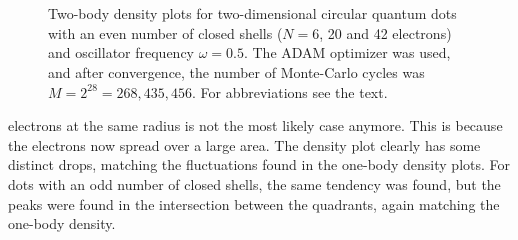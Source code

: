 \begin{figure}[H]
	\centering
	\captionsetup{width=0.9\hsize}
	\captionsetup[subfigure]{labelformat=empty}
	\hspace{0.1cm}
	\\
	
	\hspace{0.1cm}
	\\
	
	\hspace{0.1cm}
	
	\caption{Two-body density plots for two-dimensional circular quantum dots with an even number of closed shells ($N=6$, 20 and 42 electrons) and oscillator frequency $\omega=0.5$. The ADAM optimizer was used, and after convergence, the number of Monte-Carlo cycles was $M=2^{28}=268,435,456$. For abbreviations see the text.}%
	\label{fig:TB_interaction_20P}
\end{figure}
\noindent
electrons at the same radius is not the most likely case anymore. This is because the electrons now spread over a large area. The density plot clearly has some distinct drops, matching the fluctuations found in the one-body density plots. For dots with an odd number of closed shells, the same tendency was found, but the peaks were found in the intersection between the quadrants, again matching the one-body density. 

